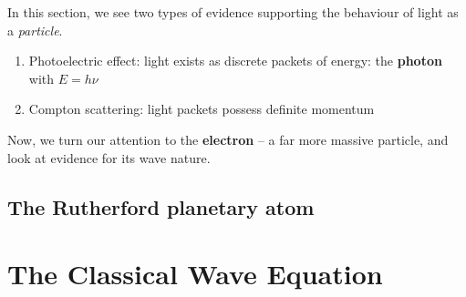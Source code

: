 \documentclass{article}
\numberwithin{theorem}{section}
\numberwithin{corollary}{section}
\numberwithin{postulate}{section}
\numberwithin{lemma}{section}
\numberwithin{definition}{section}
\begin{document}
In this section, we see two types of evidence supporting the behaviour of light as a \textit{particle}.
\begin{enumerate}
  \item Photoelectric effect: light exists as discrete packets of energy: the \textbf{photon} with $E = h\nu$ 
  \item Compton scattering: light packets possess definite momentum
\end{enumerate}

Now, we turn our attention to the \textbf{electron} – a far more massive particle, and look at evidence for its wave nature.

\subsection{The Rutherford planetary atom}

\section{The Classical Wave Equation}
\end{document}
